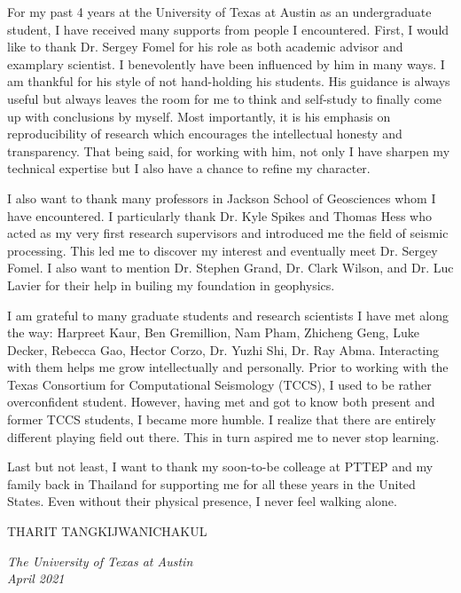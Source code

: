 For my past 4 years at the University of Texas at Austin as an undergraduate student, I have received many supports from people I encountered. First, I would like to thank Dr. Sergey Fomel for his role as both academic advisor and examplary scientist. I benevolently have been influenced by him in many ways. I am thankful for his style of not hand-holding his students. His guidance is always useful but always leaves the room for me to think and self-study to finally come up with conclusions by myself. Most importantly, it is his emphasis on reproducibility of research which encourages the intellectual honesty and transparency. That being said, for working with him, not only I have sharpen my technical expertise but I also have a chance to refine my character.

I also want to thank many professors in Jackson School of Geosciences whom I have encountered. I particularly thank Dr. Kyle Spikes and Thomas Hess who acted as my very first research supervisors and introduced me the field of seismic processing. This led me to discover my interest and eventually meet Dr. Sergey Fomel. I also want to mention Dr. Stephen Grand, Dr. Clark Wilson, and Dr. Luc Lavier for their help in builing my foundation in geophysics.

I am grateful to many graduate students and research scientists I have met along the way: Harpreet Kaur, Ben Gremillion, Nam Pham, Zhicheng Geng, Luke Decker, Rebecca Gao, Hector Corzo, Dr. Yuzhi Shi, Dr. Ray Abma. Interacting with them helps me grow intellectually and personally. Prior to working with the  Texas  Consortium for Computational  Seismology (TCCS), I used to be rather overconfident student. However, having met and got to know both present and former TCCS students, I became more humble. I realize that there are entirely different playing field out there. This in turn aspired me to never stop learning.

Last but not least, I want to thank my soon-to-be colleage at PTTEP and my family back in Thailand for supporting me for all these years in the United States. Even without their physical presence, I never feel walking alone. 


\begin{flushright}
THARIT TANGKIJWANICHAKUL
\end{flushright}

\noindent \emph{The University of Texas at Austin}\\
\noindent \emph{April 2021} \\ \\

